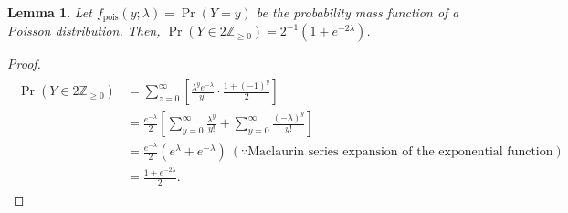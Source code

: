 \documentclass[11pt, class=article, crop=false]{standalone}
\newtheorem{lemma}{Lemma}
\begin{document}
\begin{lemma}
Let $f_{\text{pois}}(y; \lambda) = \Pr(Y = y)$ be the probability mass function of a Poisson distribution.
Then, $\Pr(Y \in 2\mathbb{Z}_{\ge 0}) = 2^{-1}(1 + e^{- 2 \lambda})$.
\end{lemma}
\begin{proof}
\begin{align}
    \begin{split}
        \Pr(Y \in 2\mathbb{Z}_{\ge 0}) 
        &= \sum_{z = 0}^{\infty} \left[ \frac{\lambda^{y} e^{-\lambda}}{y!} \cdot \frac{1 + (-1)^{y}}{2} \right]\\
        &= \frac{e^{-\lambda}}{2} \left[ \sum_{y = 0}^{\infty} \frac{\lambda^{y}}{y!} + \sum_{y = 0}^{\infty} \frac{(-\lambda)^{y}}{y!}\right]\\
        &= \frac{e^{-\lambda}}{2} (e^{\lambda} + e^{-\lambda}) ~ (\because \text{Maclaurin series expansion of the exponential function})\\
        &= \frac{1 + e^{- 2 \lambda}}{2}.
    \end{split}
\end{align}
\end{proof}
\newpage
\end{document}
